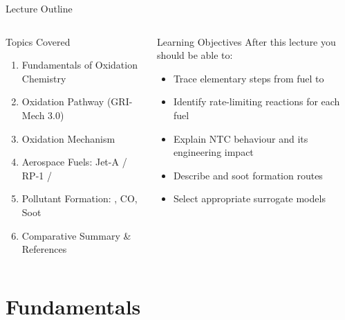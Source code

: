 \documentclass[aspectratio=169,10pt]{beamer}
\begin{document}
\begin{frame}{Lecture Outline}
  \begin{columns}[t]
    \begin{block}{Topics Covered}
      \begin{enumerate}
        \item Fundamentals of Oxidation Chemistry
        \item {} Oxidation Pathway (GRI-Mech 3.0)
        \item {} Oxidation Mechanism
        \item Aerospace Fuels: Jet-A / RP-1 / 
        \item Pollutant Formation: , CO, Soot
        \item Comparative Summary \& References
      \end{enumerate}
    \end{block}
    \begin{alertblock}{Learning Objectives}
      After this lecture you should be able to:
      \begin{itemize}
        \item Trace elementary steps from fuel to 
        \item Identify rate-limiting reactions for each fuel
        \item Explain NTC behaviour and its engineering impact
        \item Describe  and soot formation routes
        \item Select appropriate surrogate models
      \end{itemize}
    \end{alertblock}
  \end{columns}
\end{frame}

\section{Fundamentals}
\end{document}
